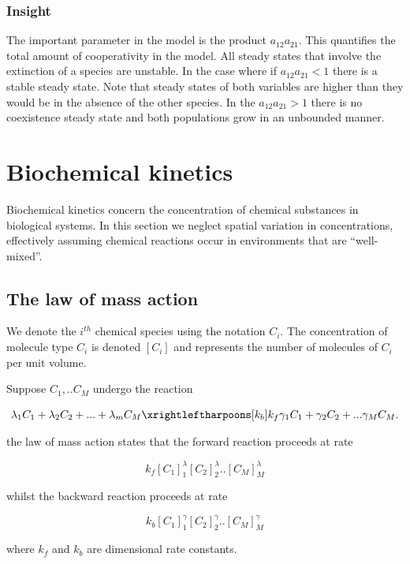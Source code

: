 \documentclass[
  letterpaper,
  DIV=11,
  numbers=noendperiod]{scrreprt}
\begin{document}
\subsection{Insight}\label{insight-1}

The important parameter in the model is the product \(a_{12}a_{21}\).
This quantifies the total amount of cooperativity in the model. All
steady states that involve the extinction of a species are unstable. In
the case where if \(a_{12}a_{21}<1\) there is a stable steady state.
Note that steady states of both variables are higher than they would be
in the absence of the other species. In the \(a_{12}a_{21}>1\) there is
no coexistence steady state and both populations grow in an unbounded
manner.

\chapter{Biochemical kinetics}\label{biochemical-kinetics}

Biochemical kinetics concern the concentration of chemical substances in
biological systems. In this section we neglect spatial variation in
concentrations, effectively assuming chemical reactions occur in
environments that are ``well-mixed''.

\section{The law of mass action}\label{the-law-of-mass-action}

We denote the \(i^{th}\) chemical species using the notation \(C_i\).
The concentration of molecule type \(C_i\) is denoted \([C_i]\) and
represents the number of molecules of \(C_i\) per unit volume.

Suppose \(C_1,..C_M\) undergo the reaction

\[
\lambda_1C_1+\lambda_2 C_2+...+\lambda_m C_M \xrightleftharpoons[k_{b}]{k_{f}} 
\gamma_1 C_1+\gamma_2 C_2 + ... \gamma_M C_M.
\]

the law of mass action states that the forward reaction proceeds at rate

\[
k_f[C_1]^\lambda_1 [C_2]^\lambda_2 ..[C_M]^\lambda_M
\]

whilst the backward reaction proceeds at rate

\[
k_b[C_1]^\gamma_1[C_2]^\gamma_2 ..[C_M]^\gamma_M
\]

where \(k_f\) and \(k_b\) are dimensional rate constants.
\end{document}
